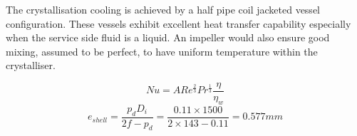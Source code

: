 The crystallisation cooling is achieved by a half pipe coil jacketed vessel configuration. These vessels exhibit excellent heat transfer capability especially when the service side fluid is a liquid. An impeller would also ensure good mixing, assumed to be perfect, to have uniform temperature within the crystalliser.

\begin{equation}

    Nu = ARe^{\frac{2}{3}}Pr^{\frac{1}{3}}\frac{\eta}{\eta_w}
    
\end{equation}
\begin{equation}
    e_{shell} = \frac{p_dD_i}{2f-p_d} = \frac{0.11 \times 1500}{2 \times 143 - 0.11} = 0.577mm
    \label{eqn:minthicknessshell}
\end{equation}

